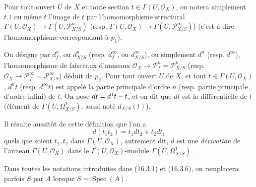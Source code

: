 Pour tout ouvert $U$ de $X$ et toute section $t\in\Gamma(U,\mathcal{O}_X)$, on
notera simplement $t.1$ ou même $t$ l'image de $t$ par l'homomorphisme
structural $\Gamma(U,\mathcal{O}_X)\to\Gamma(U,\mathscr{P}_{X/S}^n)$ (resp.
$\Gamma(U,\mathcal{O}_X)\to\Gamma(U,\mathscr{P}_{X/S}^\infty)$)
(c'est-à-dire l'homomorphisme correspondant à $p_1$).

\begin{definition}[16.3.6]
On désigne par $d_f^n$, ou $d_{X/S}^n$ \textup{(resp.} $d_f^\infty$, ou
$d_{X/S}^\infty$), ou simplement $d^n$ \textup{(resp.} $d^\infty$), l'homomorphisme de
faisceaux d'anneaux $\mathcal{O}_X\to\mathscr{P}_f^n=\mathscr{P}_{X/S}^n$
\textup{(resp.} $\mathcal{O}_X\to\mathscr{P}_f^\infty=\mathscr{P}_{X/S}^\infty$)
déduit de $p_2$. Pour tout ouvert $U$ de $X$, et tout
$t\in\Gamma(U,\mathcal{O}_X)$, $d^nt$ \textup{(resp.} $d^\infty t$) est appelé \textup{la partie
principale d'ordre $n$ (resp. partie principale d'ordre infini)} de $t$. On pose
$dt=d^1t- t$, et on dit que $dt$ est la différentielle de $t$ (élément de
$\Gamma(U,\varOmega_{X/S}^1)$, aussi noté $d_{X/S}(t)$).
\end{definition}

Il résulte aussitôt de cette définition que l'on a
\[
  d(t_1t_2)=t_1dt_2+t_2dt_1
  \tag{16.3.6.1}
  \label{IV.16.3.6.1}
\]
quels que soient $t_1,t_2$ dans $\Gamma(U,\mathcal{O}_X)$, autrement dit, $d$
est une \emph{dérivation} de l'anneau $\Gamma(U,\mathcal{O}_X)$ dans le
$\Gamma(U,\mathcal{O}_X)$-module $\Gamma(U,\varOmega_{X/S}^1)$.

Dans toutes les notations introduites dans (16.3.1) et (16.3.6), on remplacera
parfois $S$ par $A$ lorsque $S=\operatorname{Spec}(A)$.

